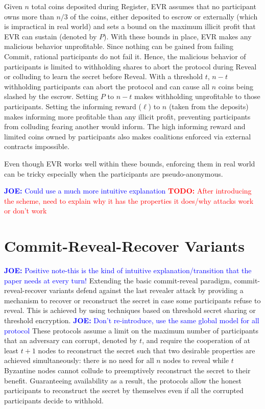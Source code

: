 \documentclass[letterpaper,twocolumn,10pt]{article}
\theoremstyle{definition}
\theoremstyle{remark}
\newcommand{\todo}[1]{\textcolor{red}{\textbf{TODO:} #1}}
\newcommand{\joenote}[1]{\textcolor{blue}{\textbf{JOE:} #1}}
\begin{document}
Given $n$ total coins deposited during Register, EVR assumes that no participant owns more than $n/3$ of the coins, either deposited to escrow or externally (which is impractical in real world) and sets a bound on the maximum illicit profit that EVR can sustain (denoted by $P$). With these bounds in place, EVR makes any malicious behavior unprofitable. Since nothing can be gained from failing Commit, rational participants do not fail it. Hence, the malicious behavior of participants is limited to withholding shares to abort the protocol during Reveal or colluding to learn the secret before Reveal. With a threshold $t$, $n-t$ withholding participants can abort the protocol and can cause all $n$ coins being slashed by the escrow. Setting $P$ to $n-t$ makes withholding unprofitable to those participants. Setting the informing reward ($\ell$) to $n$ (taken from the deposits) makes informing more profitable than any illicit profit, preventing participants from colluding fearing another would inform. The high informing reward and limited coins owned by participants also makes coalitions enforced via external contracts impossible.

Even though EVR works well within these bounds, enforcing them in real world can be tricky especially when the participants are pseudo-anonymous.

\joenote{Could use a much more intuitive explanation}
\todo{After introducing the scheme, need to explain why it has the properties it does/why attacks work or don't work}


\section{Commit-Reveal-Recover Variants}
\label{section:commit-reveal-recover}
\joenote{Positive note-this is the kind of intuitive explanation/transition that the paper needs at every turn!}
Extending the basic commit-reveal paradigm, commit-reveal-recover variants defend against the last revealer attack by providing a mechanism to recover or reconstruct the secret in case some participants refuse to reveal. This is achieved by using techniques based on threshold secret sharing or threshold encryption. \joenote{Don't re-introduce, use the same global model for all protocol} These protocols assume a limit on the maximum number of participants that an adversary can corrupt, denoted by $t$, and require the cooperation of at least $t + 1$ nodes to reconstruct the secret such that two desirable properties are achieved simultaneously: there is no need for all $n$ nodes to reveal while $t$ Byzantine nodes cannot collude to preemptively reconstruct the secret to their benefit. Guaranteeing availability as a result, the protocols allow the honest participants to reconstruct the secret by themselves even if all the corrupted participants decide to withhold.
\end{document}
